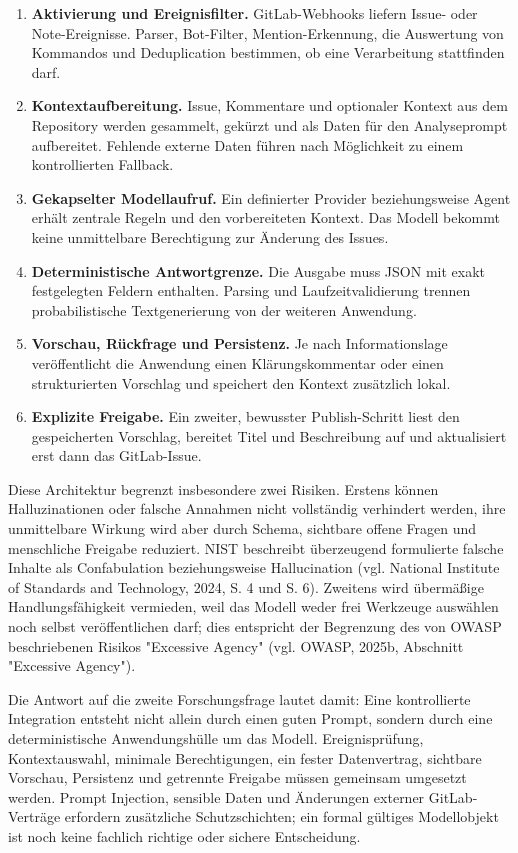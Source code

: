 \begin{enumerate}[leftmargin=1.2cm]
\item \textbf{Aktivierung und Ereignisfilter.} GitLab-Webhooks liefern Issue- oder Note-Ereignisse. Parser, Bot-Filter, Mention-Erkennung, die Auswertung von Kommandos und Deduplication bestimmen, ob eine Verarbeitung stattfinden darf.
\item \textbf{Kontextaufbereitung.} Issue, Kommentare und optionaler Kontext aus dem Repository werden gesammelt, gekürzt und als Daten für den Analyseprompt aufbereitet. Fehlende externe Daten führen nach Möglichkeit zu einem kontrollierten Fallback.
\item \textbf{Gekapselter Modellaufruf.} Ein definierter Provider beziehungsweise Agent erhält zentrale Regeln und den vorbereiteten Kontext. Das Modell bekommt keine unmittelbare Berechtigung zur Änderung des Issues.
\item \textbf{Deterministische Antwortgrenze.} Die Ausgabe muss JSON mit exakt festgelegten Feldern enthalten. Parsing und Laufzeitvalidierung trennen probabilistische Textgenerierung von der weiteren Anwendung.
\item \textbf{Vorschau, Rückfrage und Persistenz.} Je nach Informationslage veröffentlicht die Anwendung einen Klärungskommentar oder einen strukturierten Vorschlag und speichert den Kontext zusätzlich lokal.
\item \textbf{Explizite Freigabe.} Ein zweiter, bewusster Publish-Schritt liest den gespeicherten Vorschlag, bereitet Titel und Beschreibung auf und aktualisiert erst dann das GitLab-Issue.
\end{enumerate}

Diese Architektur begrenzt insbesondere zwei Risiken. Erstens können Halluzinationen oder falsche Annahmen nicht vollständig verhindert werden, ihre unmittelbare Wirkung wird aber durch Schema, sichtbare offene Fragen und menschliche Freigabe reduziert. NIST beschreibt überzeugend formulierte falsche Inhalte als Confabulation beziehungsweise Hallucination (vgl. National Institute of Standards and Technology, 2024, S. 4 und S. 6). Zweitens wird übermäßige Handlungsfähigkeit vermieden, weil das Modell weder frei Werkzeuge auswählen noch selbst veröffentlichen darf; dies entspricht der Begrenzung des von OWASP beschriebenen Risikos "Excessive Agency" (vgl. OWASP, 2025b, Abschnitt "Excessive Agency").

Die Antwort auf die zweite Forschungsfrage lautet damit: Eine kontrollierte Integration entsteht nicht allein durch einen guten Prompt, sondern durch eine deterministische Anwendungshülle um das Modell. Ereignisprüfung, Kontextauswahl, minimale Berechtigungen, ein fester Datenvertrag, sichtbare Vorschau, Persistenz und getrennte Freigabe müssen gemeinsam umgesetzt werden. Prompt Injection, sensible Daten und Änderungen externer GitLab-Verträge erfordern zusätzliche Schutzschichten; ein formal gültiges Modellobjekt ist noch keine fachlich richtige oder sichere Entscheidung.

